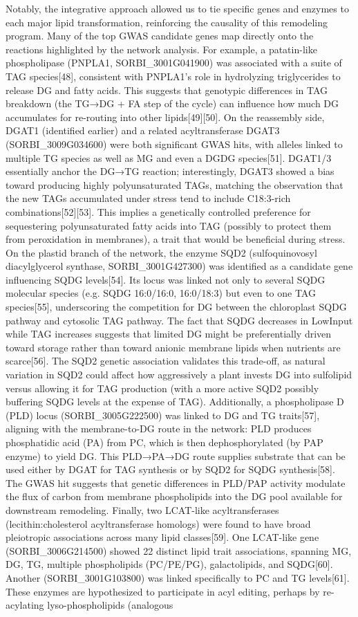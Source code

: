 \documentclass[10pt,letterpaper]{article}
\begin{document}
\begin{itemize}
Notably, the integrative approach allowed us to tie specific genes and enzymes to each major lipid transformation, reinforcing the causality of this remodeling program. Many of the top GWAS candidate genes map directly onto the reactions highlighted by the network analysis. For example, a patatin-like phospholipase (PNPLA1, SORBI\_3001G041900) was associated with a suite of TAG species[48], consistent with PNPLA1’s role in hydrolyzing triglycerides to release DG and fatty acids. This suggests that genotypic differences in TAG breakdown (the TG→DG + FA step of the cycle) can influence how much DG accumulates for re-routing into other lipids[49][50]. On the reassembly side, DGAT1 (identified earlier) and a related acyltransferase DGAT3 (SORBI\_3009G034600) were both significant GWAS hits, with alleles linked to multiple TG species as well as MG and even a DGDG species[51]. DGAT1/3 essentially anchor the DG→TG reaction; interestingly, DGAT3 showed a bias toward producing highly polyunsaturated TAGs, matching the observation that the new TAGs accumulated under stress tend to include C18:3-rich combinations[52][53]. This implies a genetically controlled preference for sequestering polyunsaturated fatty acids into TAG (possibly to protect them from peroxidation in membranes), a trait that would be beneficial during stress. On the plastid branch of the network, the enzyme SQD2 (sulfoquinovosyl diacylglycerol synthase, SORBI\_3001G427300) was identified as a candidate gene influencing SQDG levels[54]. Its locus was linked not only to several SQDG molecular species (e.g. SQDG 16:0/16:0, 16:0/18:3) but even to one TAG species[55], underscoring the competition for DG between the chloroplast SQDG pathway and cytosolic TAG pathway. The fact that SQDG decreases in LowInput while TAG increases suggests that limited DG might be preferentially driven toward storage rather than toward anionic membrane lipids when nutrients are scarce[56]. The SQD2 genetic association validates this trade-off, as natural variation in SQD2 could affect how aggressively a plant invests DG into sulfolipid versus allowing it for TAG production (with a more active SQD2 possibly buffering SQDG levels at the expense of TAG). Additionally, a phospholipase D (PLD) locus (SORBI\_3005G222500) was linked to DG and TG traits[57], aligning with the membrane-to-DG route in the network: PLD produces phosphatidic acid (PA) from PC, which is then dephosphorylated (by PAP enzyme) to yield DG. This PLD→PA→DG route supplies substrate that can be used either by DGAT for TAG synthesis or by SQD2 for SQDG synthesis[58]. The GWAS hit suggests that genetic differences in PLD/PAP activity modulate the flux of carbon from membrane phospholipids into the DG pool available for downstream remodeling. Finally, two LCAT-like acyltransferases (lecithin:cholesterol acyltransferase homologs) were found to have broad pleiotropic associations across many lipid classes[59]. One LCAT-like gene (SORBI\_3006G214500) showed 22 distinct lipid trait associations, spanning MG, DG, TG, multiple phospholipids (PC/PE/PG), galactolipids, and SQDG[60]. Another (SORBI\_3001G103800) was linked specifically to PC and TG levels[61]. These enzymes are hypothesized to participate in acyl editing, perhaps by re-acylating lyso-phospholipids (analogous 
\end{itemize}
\end{document}

